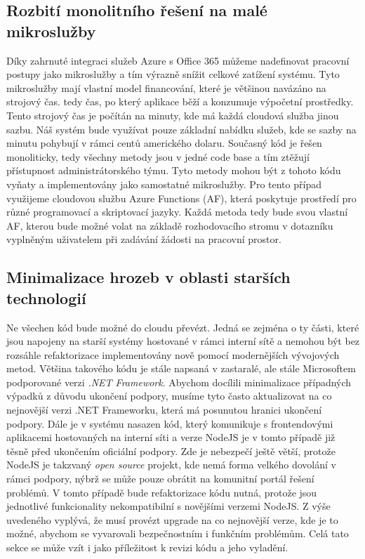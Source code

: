 \documentclass[12pt]{article}
\begin{document}
\begin{sloppypar}
\begin{spacing}{1.15}
        \subsection*{Rozbití monolitního řešení na malé mikroslužby}
        Díky zahrnuté integraci služeb Azure s Office 365 můžeme nadefinovat 
        pracovní postupy jako mikroslužby a tím výrazně snížit celkové zatížení
        systému. Tyto mikroslužby mají vlastní model financování, které je
        většinou navázáno na strojový čas. tedy čas, po který aplikace běží a
        konzumuje výpočetní prostředky. Tento strojový čas je počítán na minuty,
        kde má každá cloudová služba jinou sazbu. Náš systém bude využívat pouze
        základní nabídku služeb, kde se sazby na minutu pohybují v rámci centů
        amerického dolaru. Současný kód je řešen monoliticky, tedy všechny
        metody jsou v jedné code base a tím ztěžují přístupnost
        administrátorského týmu. Tyto metody mohou být z tohoto kódu vyňaty a
        implementovány jako samostatné mikroslužby. Pro tento případ využijeme
        cloudovou službu Azure Functions (AF), která poskytuje prostředí pro různé
        programovací a skriptovací jazyky. Každá metoda tedy bude svou vlastní
        AF, kterou bude možné volat na základě rozhodovacího stromu v dotazníku
        vyplněným uživatelem při zadávání žádosti na pracovní prostor. 
        
        \subsection*{Minimalizace hrozeb v oblasti starších technologií}
        Ne všechen kód bude možné do cloudu převézt. Jedná se zejména o ty
        části, které jsou napojeny na starší systémy hostované v rámci interní
        sítě a nemohou být bez rozsáhle refaktorizace implementovány nově pomocí
        modernějších vývojových metod. Většina takového kódu je stále napsaná v
        zastaralé, ale stále Microsoftem podporované verzi \textit{.NET Framework}.
        Abychom docílili minimalizace případných výpadků z důvodu ukončení
        podpory, musíme tyto často aktualizovat na co nejnovější verzi .NET
        Frameworku, která má posunutou hranici ukončení podpory. Dále je v
        systému nasazen kód, který komunikuje s frontendovými aplikacemi
        hostovaných na interní síti a verze NodeJS je v tomto případě již těsně
        před ukončením oficiální podpory. Zde je nebezpečí ještě větší, protože
        NodeJS je takzvaný \textit{open source} projekt, kde nemá forma velkého
        dovolání v rámci podpory, nýbrž se může pouze obrátit na komunitní
        portál řešení problémů. V tomto případě bude refaktorizace kódu nutná,
        protože jsou jednotlivé funkcionality nekompatibilní s novějšími verzemi
        NodeJS. Z výše uvedeného vyplývá, že musí provézt upgrade na co nejnovější 
        verze, kde je to možné, abychom se vyvarovali bezpečnostním i funkčním
        problémům. Celá tato sekce se může vzít i jako příležitost k revizi kódu
        a jeho vyladění.


\end{spacing}
\end{sloppypar}
\end{document}
